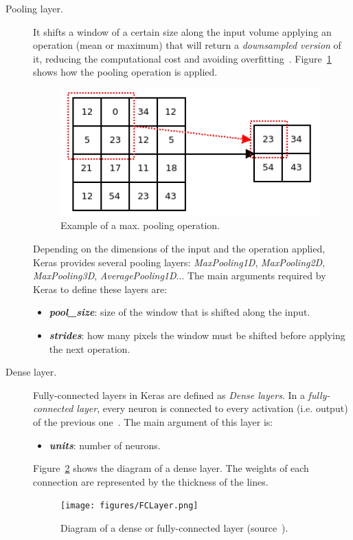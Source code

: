 \begin{description}
	\item[Pooling layer.] It shifts a window of a certain size along the input volume applying an operation (mean or maximum) that will return a \emph{\textit{downsampled} version} of it, reducing the computational cost and avoiding overfitting~\cite{Scherer2010Evaluation}. Figure~\ref{fig:pooling} shows how the pooling operation is applied.

	\begin{figure}
		\centering
		\includegraphics[width=10cm, keepaspectratio]{figures/pooling.png}
		\caption{Example of a max. pooling operation.}
		\label{fig:pooling}
	\end{figure}
	
	Depending on the dimensions of the input and the operation applied, Keras provides several pooling layers: \textit{MaxPooling1D}, \textit{MaxPooling2D}, \textit{MaxPooling3D}, \textit{AveragePooling1D}... The main arguments required by Keras to define these layers are:
	\begin{itemize}
		\item \textbf{\textit{pool\_size}}: size of the window that is shifted along the input.
		\item \textbf{\textit{strides}}: how many pixels the window must be shifted before applying the next operation.
	\end{itemize}
\end{description}

\begin{description}
	\item[Dense layer.] Fully-connected layers in Keras are defined as \textit{Dense layers}. In a \emph{fully-connected layer}, every neuron is connected to every activation (i.e. output) of the previous one~\cite{cs231n}. The main argument of this layer is:
	\begin{itemize}
		\item \textbf{\textit{units}}: number of neurons.
	\end{itemize}
	Figure~\ref{fig:fc} shows the diagram of a dense layer. The weights of each connection are represented by the thickness of the lines.
	\begin{figure}
		\centering
		\texttt{[image: figures/FCLayer.png]}
		\caption{Diagram of a dense or fully-connected layer (source~\cite{fc}).}
		\label{fig:fc}
	\end{figure}
\end{description}

